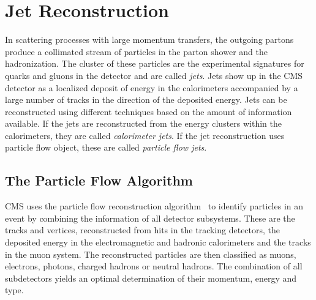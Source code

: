 
\chapter{Jet Reconstruction}

In scattering processes with large momentum transfers, the outgoing partons
produce a collimated stream of particles in the parton shower and the
hadronization. The cluster of these particles are the experimental signatures
for quarks and gluons in the detector and are called \emph{jets}. Jets show up
in the CMS detector as a localized deposit of energy in the calorimeters
accompanied by a large number of tracks in the direction of the deposited
energy. Jets can be reconstructed using different techniques based on the amount
of information available. If the jets are reconstructed from the energy clusters
within the calorimeters, they are called \emph{calorimeter jets}. If the jet
reconstruction uses particle flow object, these are called \emph{particle flow
jets}.

\section{The Particle Flow Algorithm}

CMS uses the particle flow reconstruction
algorithm~\cite{CMS-PAS-PFT-09-001,CMS-PAS-PFT-10-001} to identify particles in
an event by combining the information of all detector subsystems. These are the
tracks and vertices, reconstructed from hits in the tracking detectors, the
deposited energy in the electromagnetic and hadronic calorimeters and the tracks
in the muon system. The reconstructed particles are then classified as muons,
electrons, photons, charged hadrons or neutral hadrons. The combination of all
subdetectors yields an optimal determination of their momentum, energy and type.

